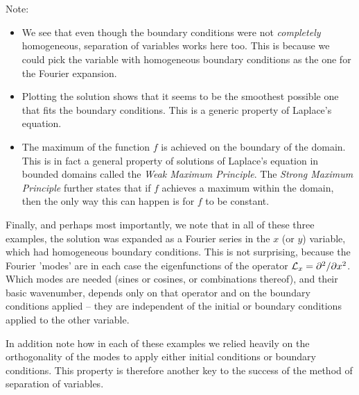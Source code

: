 \\
\\
Note: 
\begin{itemize}
\item We see that even though the boundary conditions were not {\it completely} homogeneous, separation of variables works here too. This is because we could pick the variable with homogeneous boundary conditions as the one for the  Fourier expansion. 
\item Plotting the solution shows that it seems to be the smoothest possible one that fits the boundary conditions. This is a generic property of Laplace's equation. 
\item The maximum of the function $f$ is achieved on the boundary of the domain. This is in fact a general property of solutions of Laplace's equation in bounded domains called the {\it Weak Maximum Principle}. The {\it Strong Maximum Principle} further states that if $f$ achieves a maximum within the domain, then the only way this can happen is for $f$ to be constant.
\end{itemize}

Finally, and perhaps most importantly, we note that in all of these three examples, the solution was expanded as a Fourier series in the $x$ (or $y$) variable, which had homogeneous boundary conditions. This is not surprising, because the Fourier 'modes' are in each case the eigenfunctions of the operator ${\cal L}_x = \partial^2 / \partial x^2$. Which modes are needed (sines or cosines, or combinations thereof), and their basic wavenumber, depends only on that operator and on the boundary conditions applied -- they are independent of the initial or boundary conditions applied to the other variable. 

In addition note how in each of these examples we relied heavily on the orthogonality of the modes to apply either initial conditions or boundary conditions. This property is therefore another key to the success of the method of separation of variables. 
